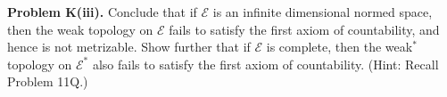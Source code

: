 \textbf{Problem K(iii).} Conclude that if $\mathcal{E}$ is an infinite dimensional normed space, then the weak topology on $\mathcal{E}$ fails to satisfy the first axiom of countability, and hence is not metrizable. Show further that if $\mathcal{E}$ is complete, then the weak$^*$ topology on $\mathcal{E}^*$ also fails to satisfy the first axiom of countability. (Hint: Recall Problem 11Q.)
